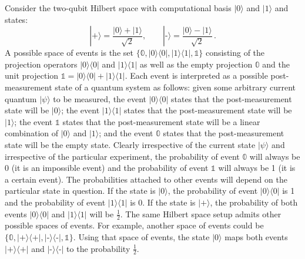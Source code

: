 \documentclass{article}
\theoremstyle{remark}
\newcommand{\ket}[1]{|#1\rangle}
\newcommand{\proj}[1]{|#1 \rangle\langle #1 |}
\newcommand{\ps}{\texttt{+}}
\newcommand{\ms}{\texttt{-}}
\begin{document}
Consider the two-qubit Hilbert space with computational basis
$\ket{0}$ and $\ket{1}$ and states:
\[
\ket{\ps}=\frac{\ket{0}+\ket{1}}{\sqrt{2}}, \qquad\ket{\ms}=\frac{\ket{0}-\ket{1}}{\sqrt{2}}\,.
\]
A possible space of events is the set
$\{ \mathbb{0}, \proj{0}, \proj{1}, \mathbb{1}\}$ consisting of the
projection operators $\proj{0}$ and $\proj{1}$ as well as the empty
projection $\mathbb{0}$ and the unit projection
$\mathbb{1} = \proj{0}+\proj{1}$. Each event is interpreted as a
possible post-measurement state of a quantum system as follows: given some
arbitrary current quantum $\ket{\psi}$ to be measured, the event
$\proj{0}$ states that the post-measurement state will be $\ket{0}$;
the event $\proj{1}$ states that the post-measurement state will be
$\ket{1}$; the event $\mathbb{1}$ states that the post-measurement
state will be a linear combination of $\ket{0}$ and $\ket{1}$; and the
event $\mathbb{0}$ states that the post-measurement state will be the
empty state. Clearly irrespective of the current state $\ket{\psi}$
and irrespective of the particular experiment, the probability of
event $\mathbb{0}$ will always be 0 (it is an impossible event) and
the probability of event $\mathbb{1}$ will always be 1 (it is a
certain event). The probabilities attached to other events will depend
on the particular state in question. If the state is $\ket{0}$, the
probability of event $\proj{0}$ is 1 and the probability of event
$\proj{1}$ is 0. If the state is $\ket{\ps}$, the probability of both
events $\proj{0}$ and $\proj{1}$ will be $\frac{1}{2}$. The same
Hilbert space setup admits other possible spaces of events. For
example, another space of events could be
$\{ \mathbb{0}, \proj{\ps}, \proj{\ms}, \mathbb{1}\}$. Using that
space of events, the state $\ket{0}$ maps both events $\proj{\ps}$ and
$\proj{\ms}$ to the probability $\frac{1}{2}$.
\end{document}
